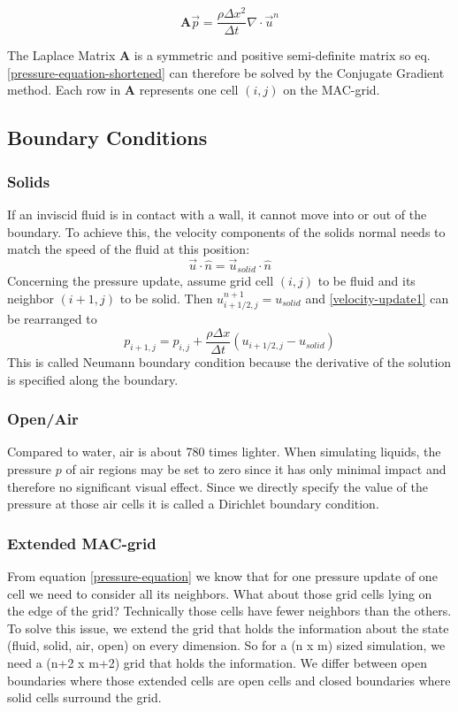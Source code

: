 \begin{equation} \label{pressure-equation-shortened}
	\mathbf{A}\vec{p} = \frac{\rho \Delta x^2}{\Delta t}\nabla \cdot \vec{u}^n
\end{equation}

The Laplace Matrix $\mathbf{A}$ is a symmetric and positive semi-definite matrix so eq. \ref{pressure-equation-shortened} can therefore be solved by the Conjugate Gradient method. Each row in \textbf{A} represents one cell $(i, j)$ on the MAC-grid. 


\subsection{Boundary Conditions}
\subsubsection{Solids}
If an inviscid fluid is in contact with a wall, it cannot move into or out of the boundary. To achieve this, the velocity components of the solids normal needs to match the speed of the fluid at this position:
\begin{equation} \label{navier-stokes12}
    \vec{u} \cdot \hat{n} = \vec{u}_{solid} \cdot \hat{n}
\end{equation}
Concerning the pressure update, assume grid cell $(i,j)$ to be fluid and its neighbor $(i+1,j)$ to be solid. Then $u_{i+1/2,j}^{n+1} = u_{solid}$ and \ref{velocity-update1} can be rearranged to 
\begin{equation} \label{navier-stokes12}
    p_{i+1,j} = p_{i,j} + \frac{\rho \Delta x}{\Delta t} (u_{i+1/2,j} - u_{solid})
\end{equation}
This is called Neumann boundary condition because the derivative of the solution is specified along the boundary.
\newpage
\subsubsection{Open/Air} \label{dirichlet}
Compared to water, air is about 780 times lighter. When simulating liquids, the pressure $p$ of air regions may be set to zero since it has only minimal impact and therefore no significant visual effect. Since we directly specify the value of the pressure at those air cells it is called a Dirichlet boundary condition.


\subsubsection{Extended MAC-grid}
From equation \ref{pressure-equation} we know that for one pressure update of one cell we need to consider all its neighbors. What about those grid cells lying on the edge of the grid? Technically those cells have fewer neighbors than the others. To solve this issue, we extend the grid that holds the information about the state (fluid, solid, air, open) on every dimension. So for a (n x m) sized simulation, we need a (n+2 x m+2) grid that holds the information. We differ between open boundaries where those extended cells are open cells and closed boundaries where solid cells surround the grid.

